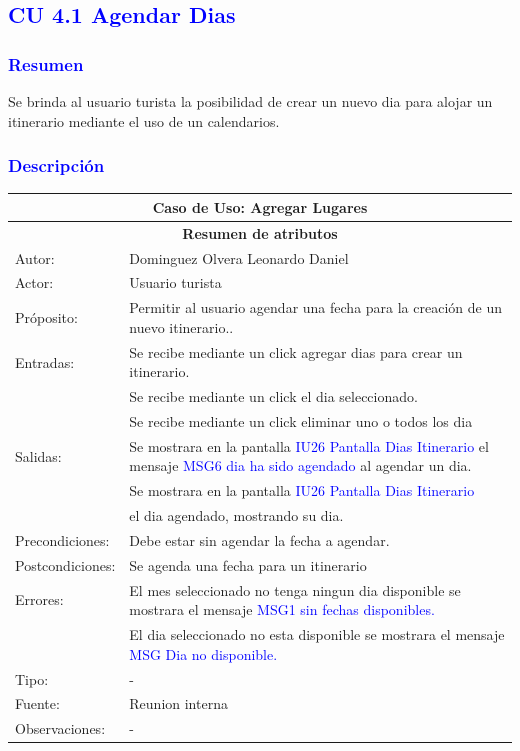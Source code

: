 \subsection{\textcolor{blue}{CU 4.1 Agendar Dias}}

\subsubsection{\textcolor{blue}{Resumen}}
Se brinda al usuario turista la posibilidad de crear un nuevo dia para alojar un itinerario mediante el uso de un calendarios.
\subsubsection{\textcolor{blue}{Descripción}}
\begin{tabularx}{16cm}{||l|X||}
	\hline
	\multicolumn{2}{||c||}{Caso de Uso: Agregar Lugares} \\
	\hline
	\multicolumn{2}{||c||}{\textbf{Resumen de atributos}} \\
	\hline
	{Autor:} & Dominguez Olvera Leonardo Daniel \\
    \hline
	{Actor:} & Usuario turista\\
	\hline
	{Próposito:} & Permitir al usuario agendar una fecha para la creación de un nuevo itinerario..\\
	\hline
	{Entradas:}&Se recibe mediante un click agregar dias para crear un itinerario.\\
  &Se recibe mediante un click el dia seleccionado.\\
  & Se recibe mediante un click eliminar uno o todos los dia \\
	\hline
	{Salidas:} &Se mostrara en la pantalla \textcolor{blue}{IU26 Pantalla Dias Itinerario} el mensaje \textcolor{blue}{MSG6 dia ha sido agendado} al agendar un dia.  \\
  & Se mostrara en la pantalla \textcolor{blue}{IU26 Pantalla Dias Itinerario}\\
  &el dia agendado, mostrando su dia.\\
	\hline
	{Precondiciones:} & Debe estar sin agendar la fecha a agendar.\\
	\hline
	{Postcondiciones:}  & Se agenda una fecha para un itinerario\\
	\hline
	{Errores:} & El mes seleccionado no tenga ningun dia disponible se mostrara el mensaje \textcolor{blue}{MSG1 sin fechas disponibles.} \\
 & El dia seleccionado no esta disponible se mostrara el mensaje \textcolor{blue}{MSG Dia no disponible.} \\
  
	\hline
	{Tipo:} & -\\
	\hline
	{Fuente:} & Reunion interna \\
	\hline
	{Observaciones:} & {-} \\
	\hline
\end{tabularx}

